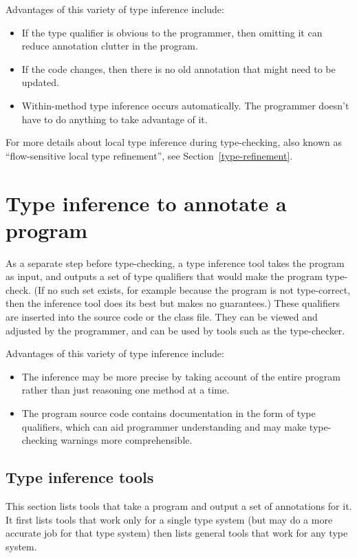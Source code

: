 Advantages of this variety of type inference include:
\begin{itemize}
\item
  If the type qualifier is obvious to the programmer, then omitting it
  can reduce annotation clutter in the program.
\item
  If the code changes, then there is no old annotation that
  might need to be updated.
\item
  Within-method type inference occurs automatically.
  The programmer doesn't have to do anything to take advantage of it.
\end{itemize}

For more details about local type inference during type-checking, also
known as ``flow-sensitive local type refinement'', see
Section~\ref{type-refinement}.


\section{Type inference to annotate a program\label{type-inference-to-annotate}}

As a separate step before type-checking, a type inference tool takes the
program as input, and outputs a set of type qualifiers that would
make the program type-check.  (If no such set exists, for example because
the program is not type-correct, then the inference tool does its best but
makes no guarantees.)
These qualifiers are inserted into the source code or the
class file.  They can be viewed and adjusted by the programmer, and can
be used by tools such as the type-checker.

Advantages of this variety of type inference include:
\begin{itemize}
\item
  The inference may be more precise by taking account of the entire program
  rather than just reasoning one method at a time.
\item
  The program source code contains documentation in the form of type
  qualifiers, which can aid programmer understanding and may make
  type-checking warnings more comprehensible.
\end{itemize}


\subsection{Type inference tools\label{type-inference-tools}}

This section lists tools that take a program and output a set of
annotations for it.
It first lists tools that work only for a single type system (but may do a
more accurate job for that type system)
then lists general tools that work for any type system.


